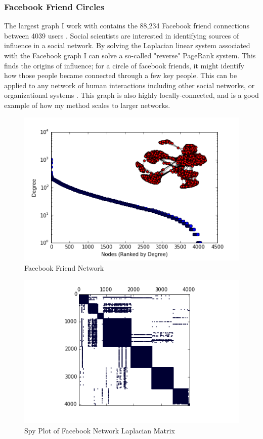 \documentclass{article}
\begin{document}
\subsubsection{Facebook Friend Circles}
The largest graph I work with contains the 88,234 Facebook friend connections between 4039 users  \cite{Mcauley:2012}. Social scientists are interested in identifying sources of influence in a social network. By solving the Laplacian linear system associated with the Facebook graph I can solve a so-called "reverse" PageRank system. This finds the origins of influence; for a circle of facebook friends, it might identify how those people became connected through a few key people. This can be applied to any network of human interactions including other social networks, or organizational systems \cite{Gleich:2015}. This graph is also highly locally-connected, and is a good example of how my method scales to larger networks.

\begin{figure}
\centering

\includegraphics[width=\linewidth]{fb_degree_histogram.png}
\caption{Facebook Friend Network}
  
\end{figure}

\begin{figure}
\centering
\includegraphics[width = \linewidth]{fbspy.png}
\caption{Spy Plot of Facebook Network Laplacian Matrix}
\end{figure}
\end{document}
